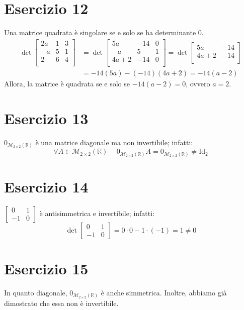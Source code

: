 \documentclass{article}
\newcommand*{\M}[3]{\mathcal{M}_{#1\times#2} \left(#3\right)}
\newcommand*{\MR}[2]{\M{#1}{#2}{\mathbb{R}}}
\begin{document}
\section*{Esercizio 12}
Una matrice quadrata è singolare se e solo se ha determinante $0$.
\[\begin{aligned}
    \det\begin{bmatrix}
        2a & 1 & 3 \\
        -a & 5 & 1 \\
        2 & 6 & 4 \\
    \end{bmatrix} &= \det\begin{bmatrix}
        5a & -14 & 0 \\
        -a & 5 & 1 \\
        4a+2 & -14 & 0 \\
    \end{bmatrix} = \det\begin{bmatrix}
        5a & -14 \\
        4a+2 & -14 \\
    \end{bmatrix} \\ &= -14(5a) - (-14)(4a+2) = -14(a-2)
\end{aligned}\]
Allora, la matrice è quadrata se e solo se $-14(a-2) = 0$, ovvero $a = 2$.

\section*{Esercizio 13}
$0_{\MR{2}{2}}$ è una matrice diagonale ma non invertibile; infatti:
\[\forall A\in\MR{2}{2}\hspace{15pt}0_{\MR{2}{2}}A=0_{\MR{2}{2}}\ne\text{Id}_2\]

\section*{Esercizio 14}
$\begin{bmatrix} 0 & 1 \\ -1 & 0 \end{bmatrix}$ è antisimmetrica e invertibile; infatti:
\[
    \det\begin{bmatrix} 0 & 1 \\ -1 & 0 \end{bmatrix} =
    0\cdot0 - 1\cdot(-1) = 1 \ne 0
\]

\section*{Esercizio 15}
In quanto diagonale, $0_{\MR{2}{2}}$ è anche simmetrica.
Inoltre, abbiamo già dimostrato che essa non è invertibile.
\end{document}

